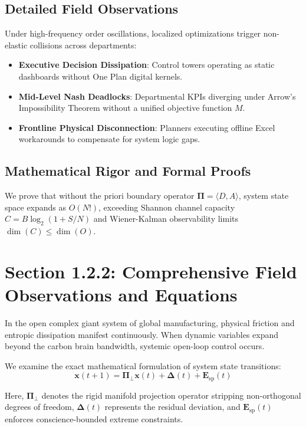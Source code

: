 \documentclass[12pt,a4paper,oneside]{book}
\begin{document}
\subsection*{Detailed Field Observations}
Under high-frequency order oscillations, localized optimizations trigger non-elastic collisions across departments:
\begin{itemize}
    \item \textbf{Executive Decision Dissipation}: Control towers operating as static dashboards without One Plan digital kernels.
    \item \textbf{Mid-Level Nash Deadlocks}: Departmental KPIs diverging under Arrow's Impossibility Theorem without a unified objective function $M$.
    \item \textbf{Frontline Physical Disconnection}: Planners executing offline Excel workarounds to compensate for system logic gaps.
\end{itemize}

\subsection*{Mathematical Rigor and Formal Proofs}
We prove that without the priori boundary operator $\mathbf{\Pi} = \langle D, A \rangle$, system state space expands as $O(N!)$, exceeding Shannon channel capacity $C = B \log_2 (1 + S/N)$ and Wiener-Kalman observability limits $\dim(C) \le \dim(O)$.
\clearpage
\section{Section 1.2.2: Comprehensive Field Observations and Equations}

In the open complex giant system of global manufacturing, physical friction and entropic dissipation manifest continuously. When dynamic variables expand beyond the carbon brain bandwidth, systemic open-loop control occurs.

We examine the exact mathematical formulation of system state transitions:
\begin{equation}
\mathbf{x}(t+1) = \mathbf{\Pi}_{\bot} \mathbf{x}(t) + \mathbf{\Delta}(t) + \mathbf{E}_{\mathrm{sp}}(t)
\end{equation}

Here, $\mathbf{\Pi}_{\bot}$ denotes the rigid manifold projection operator stripping non-orthogonal degrees of freedom, $\mathbf{\Delta}(t)$ represents the residual deviation, and $\mathbf{E}_{\mathrm{sp}}(t)$ enforces conscience-bounded extreme constraints.
\end{document}
